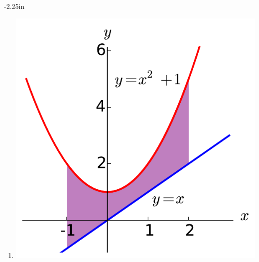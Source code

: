 \begin{adjustwidth*}{}{-2.25in}
\begin{multicols*}{2}
\bmtwo
\begin{enumerate}[1),resume]
\item \noindent
\begin{minipage}{\linewidth}
\includegraphics[scale=.35]{figs/4/4-7_Exa.pdf}
\end{minipage}


\end{enumerate}
\end{multicols*}
\end{adjustwidth*}
